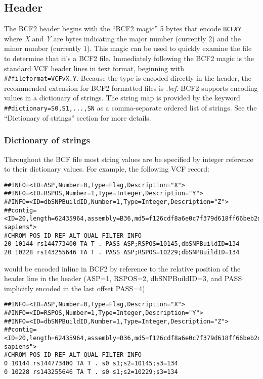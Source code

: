\documentclass[8pt]{article}
\begin{document}
\subsection{Header}

The BCF2 header begins with the ``BCF2 magic'' 5 bytes that encode
{\tt BCF\em XY} where {\em X} and {\em Y} are bytes indicating the major
number (currently 2) and the minor number (currently 1).  This magic can be
used to quickly examine the file to determine that it's a BCF2 file.
Immediately following the BCF2 magic is the standard VCF header lines in text
format, beginning with \verb|##fileformat=VCFvX.Y|.  Because the type is
encoded directly in the header, the recommended extension for BCF2 formatted
files is {\sl .bcf}.  BCF2 supports encoding values in a dictionary of strings.
The string map is provided by the keyword \verb|##dictionary=S0,S1,...,SN| as a
comma-separate ordered list of strings.  See the ``Dictionary of strings''
section for more details.

\subsubsection{Dictionary of strings}

Throughout the BCF file most string values are be specified by integer
reference to their dictionary values.  For example, the following VCF record:
\small
\begin{verbatim}
##INFO=<ID=ASP,Number=0,Type=Flag,Description="X">
##INFO=<ID=RSPOS,Number=1,Type=Integer,Description="Y">
##INFO=<ID=dbSNPBuildID,Number=1,Type=Integer,Description="Z">
##contig=<ID=20,length=62435964,assembly=B36,md5=f126cdf8a6e0c7f379d618ff66beb2da,species="Homo sapiens">
#CHROM POS ID REF ALT QUAL FILTER INFO
20 10144 rs144773400 TA T . PASS ASP;RSPOS=10145,dbSNPBuildID=134
20 10228 rs143255646 TA T . PASS ASP;RSPOS=10229;dbSNPBuildID=134
\end{verbatim}
\normalsize
would be encoded inline in BCF2 by reference to the relative position of the header line in the header (ASP=1, RSPOS=2, dbSNPBuildID=3, and PASS implicitly encoded in the last offset PASS=4)

\small
\begin{verbatim}
##INFO=<ID=ASP,Number=0,Type=Flag,Description="X">
##INFO=<ID=RSPOS,Number=1,Type=Integer,Description="Y">
##INFO=<ID=dbSNPBuildID,Number=1,Type=Integer,Description="Z">
##contig=<ID=20,length=62435964,assembly=B36,md5=f126cdf8a6e0c7f379d618ff66beb2da,species="Homo sapiens">
#CHROM POS ID REF ALT QUAL FILTER INFO
0 10144 rs144773400 TA T . s0 s1;s2=10145;s3=134
0 10228 rs143255646 TA T . s0 s1;s2=10229;s3=134
\end{verbatim}
\normalsize
\end{document}
